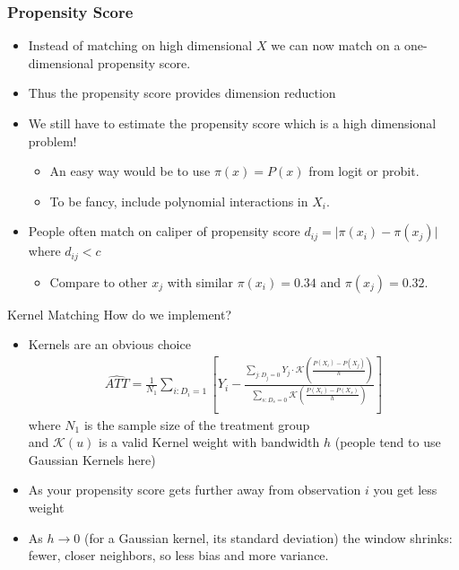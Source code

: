\documentclass[aspectratio=169,11pt]{beamer}
\begin{document}
\begin{frame}
\frametitle{Propensity Score}
\begin{itemize}
\item Instead of matching on high dimensional $X$ we can now match on a one-dimensional propensity score.
\item Thus the propensity score provides \alert{dimension reduction}
\item We still have to estimate the propensity score which is a high dimensional problem!
\begin{itemize}
\item An easy way would be to use $\pi(x)=P(x)$ from logit or probit.
\item To be fancy, include polynomial interactions in $X_i$.
\end{itemize}
\item People often match on \alert{caliper} of propensity score $d_{ij} = \lvert\pi(x_i) - \pi(x_j)\rvert$ where $d_{ij} < c$
\begin{itemize}
\item Compare to other $x_j$ with similar $\pi(x_i)=0.34$ and $\pi(x_j)=0.32$.
\end{itemize}

\end{itemize}
\end{frame}





\begin{frame}{Kernel Matching}
How do we implement?
\begin{itemize}
\item Kernels are an obvious choice
\begin{align*}
\widehat{ATT} = \frac{1}{N_1} \sum_{i: D_i=1} \left[Y_i - \frac{\sum_{j: D_j=0} Y_j \cdot \mathcal{K}\left(\frac{P(X_i) - P(X_j)}{h} \right) }{\sum_{s: D_s=0}  \mathcal{K}\left(\frac{P(X_i) - P(X_s)}{h} \right)}   \right]
\end{align*}
 where $N_1$ is the sample size of the treatment group \\
 and $\mathcal{K}(u)$ is a valid Kernel weight with bandwidth $h$ (people tend to use Gaussian Kernels here)
\item As your propensity score gets further away from observation $i$ you get less weight
\item As $h \rightarrow 0$ (for a Gaussian kernel, its standard deviation) the window shrinks: fewer, closer neighbors, so less bias and more variance.
\end{itemize}
\end{frame}
\end{document}
